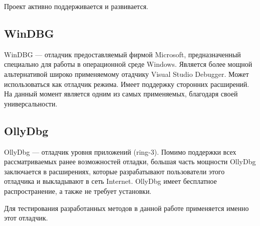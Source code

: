 Проект активно поддерживается и развивается.

\subsection{WinDBG}
WinDBG --- отладчик предоставляемый фирмой Microsoft, предназначенный специально
для работы в операционной среде Windows. Является более мощной альтернативой
широко применяемому отадчику Visual Studio Debugger. Может использоваться как
отладчик режима. Имеет поддержку сторонних расширений. На данный момент является
одним из самых применяемых, благодаря своей универсальности.

\subsection{OllyDbg}
OllyDbg --- отладчик уровня приложений (ring-3). Помимо поддержки всех
рассматриваемых ранее возможностей отладки, большая часть мощности OllyDbg
заключается в расширениях, которые разрабатывают пользователи этого отладчика и
выкладывают в сеть Internet. OllyDbg имеет бесплатное распространение, а также
не требует установки. 

Для тестирования разработанных методов в данной работе применяется именно этот
отладчик.
